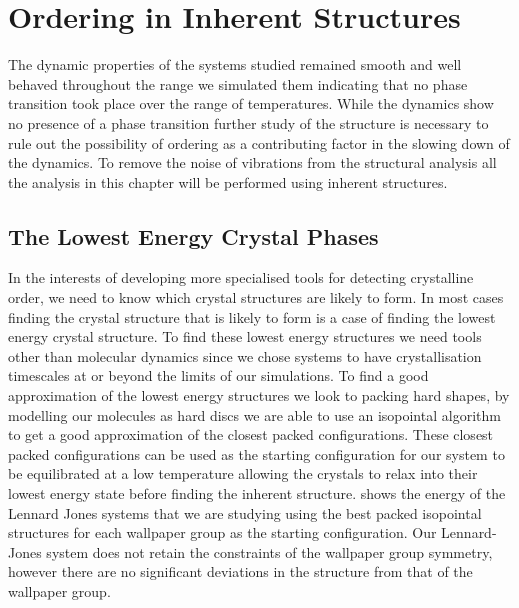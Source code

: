 \chapter{Ordering in Inherent Structures}

The dynamic properties of the systems studied remained smooth and well behaved throughout the range we simulated them indicating that no phase transition took place over the range of temperatures. While the dynamics show no presence of a phase transition further study of the structure is necessary to rule out the possibility of ordering as a contributing factor in the slowing down of the dynamics. To remove the noise of vibrations from the structural analysis all the analysis in this chapter will be performed using inherent structures.


\section{The Lowest Energy Crystal Phases}

In the interests of developing more specialised tools for detecting crystalline order, we need to know which crystal structures are likely to form. In most cases finding the crystal structure that is likely to form is a case of finding the lowest energy crystal structure. To find these lowest energy structures we need tools other than molecular dynamics since we chose systems to have crystallisation timescales at or beyond the limits of our simulations. To find a good approximation of the lowest energy structures we look to packing hard shapes, by modelling our molecules as hard discs we are able to use an isopointal algorithm to get a good approximation of the closest packed configurations. These closest packed configurations can be used as the starting configuration for our system to be equilibrated at a low temperature allowing the crystals to relax into their lowest energy state before finding the inherent structure.  shows the energy of the Lennard Jones systems that we are studying using the best packed isopointal structures for each wallpaper group as the starting configuration. Our Lennard-Jones system does not retain the constraints of the wallpaper group symmetry, however there are no significant deviations in the structure from that of the wallpaper group.

